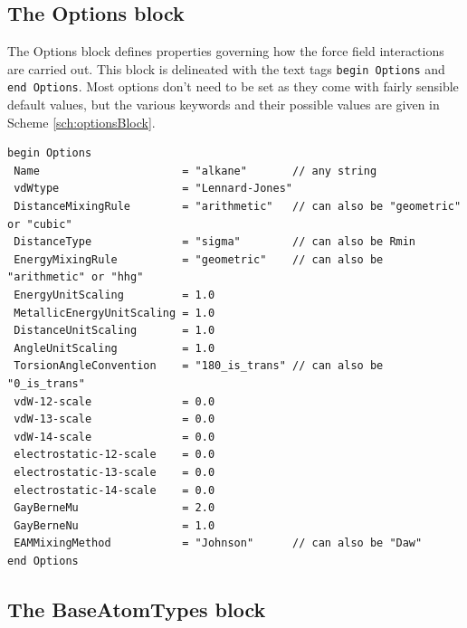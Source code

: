 \documentclass[]{book}
\begin{document}
\subsection{\label{section:ffOptions}The Options block}

The Options block defines properties governing how the force field
interactions are carried out.  This block is delineated with the text
tags {\tt begin Options} and {\tt end Options}.  Most options don't
need to be set as they come with fairly sensible default values, but
the various keywords and their possible values are given in Scheme
\ref{sch:optionsBlock}. 

\begin{lstlisting}[caption={[A force field Options block showing default values
for many force field options.] A force field Options block showing default values
for many force field options.  Most of these options do not need to be
specified if the default values are working.},
label={sch:optionsBlock}] 
begin Options
 Name                      = "alkane"       // any string
 vdWtype                   = "Lennard-Jones" 
 DistanceMixingRule        = "arithmetic"   // can also be "geometric" or "cubic"
 DistanceType              = "sigma"        // can also be Rmin
 EnergyMixingRule          = "geometric"    // can also be "arithmetic" or "hhg"
 EnergyUnitScaling         = 1.0
 MetallicEnergyUnitScaling = 1.0
 DistanceUnitScaling       = 1.0
 AngleUnitScaling          = 1.0
 TorsionAngleConvention    = "180_is_trans" // can also be "0_is_trans"
 vdW-12-scale              = 0.0
 vdW-13-scale              = 0.0
 vdW-14-scale              = 0.0
 electrostatic-12-scale    = 0.0
 electrostatic-13-scale    = 0.0
 electrostatic-14-scale    = 0.0
 GayBerneMu                = 2.0
 GayBerneNu                = 1.0
 EAMMixingMethod           = "Johnson"      // can also be "Daw"
end Options
\end{lstlisting}

\subsection{\label{section:ffBase}The BaseAtomTypes block}
\end{document}
